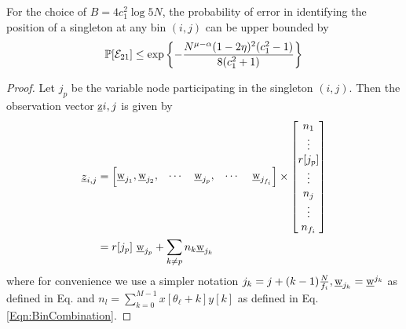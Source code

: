 \begin{lemma}
For the choice of $B=4c_1^2\log 5N$, the probability of error in identifying the position of a singleton at any bin $(i,j)$ can be upper bounded by
\begin{align*}
\mathbb{P}[\mathcal{E}_{21}]\leq \exp\left\lbrace-\frac{N^{\mu-\alpha}(1-2\eta)^2(c_1^2-1)}{8(c_1^2+1)}\right\rbrace
\end{align*}
\end{lemma}
\begin{proof}
	
	Let $j_p$ be the variable node participating in the singleton $(i,j)$. Then the observation vector $\underline{\mathrm{z}}{i,j}$ is given by
	\begin{align*}
	\underline{z}_{i,j} &= \begin{bmatrix}
	\wv_{j_{1}},\wv_{j_2}, & \cdots   & \wv_{j_p}, &\cdots \ &\wv_{j_{f_i}}
	\end{bmatrix} \times
	\begin{bmatrix}
	n_{1} \\
	\vdots \\
	r[j_p]\\
	\vdots\\
	n_{j} \\
	\vdots\\
	n_{f_i}\\
	\end{bmatrix}\\
	&= r[j_p] ~ \wv_{j_p}+ \sum_{k \neq p}n_k \wv_{j_k} \\
	\end{align*}
	where for convenience we use a simpler notation $j_k=j+(k-1)\frac{N}{f_i}, \underline{\mathrm{w}}_{j_k}=\underline{\mathrm{w}}^{j_k}$ as defined in Eq. and $n_{l}=\sum\limits_{k=0}^{M-1}x[\theta_{\ell}+k]y[k]$ as defined in Eq. \eqref{Eqn:BinCombination}.
	

\end{proof}
